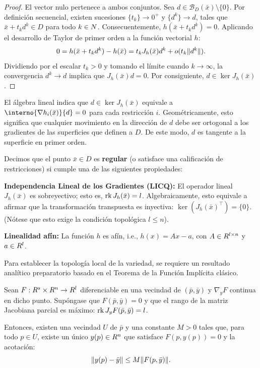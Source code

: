 \begin{proof}
	El vector nulo pertenece a ambos conjuntos. Sea $d \in \mathcal{B}_D(\bar{x}) \setminus \{0\}$. Por definición secuencial, existen sucesiones $\{t_k\} \to 0^+$ y $\{d^k\} \to d$, tales que $\bar{x} + t_k d^k \in D$ para todo $k \in N$. Consecuentemente, $h(\bar{x} + t_k d^k) = 0$. Aplicando el desarrollo de Taylor de primer orden a la función vectorial $h$:
	\[
 0 = h(\bar{x} + t_k d^k) - h(\bar{x}) = t_k J_h(\bar{x})d^k + o(t_k \lVert d^k\rVert).
	\]
	Dividiendo por el escalar $t_k > 0$ y tomando el límite cuando $k \to \infty$, la convergencia $d^k \to d$ implica que $J_h(\bar{x})d = 0$. Por consiguiente, $d \in \ker J_h(\bar{x})$.
\end{proof}

\begin{notabox}
 El álgebra lineal indica que $d \in \ker J_h(\bar{x})$ equivale a $\interno{\nabla h_i(\bar{x})}{d} = 0$ para cada restricción $i$. Geométricamente, esto significa que cualquier movimiento en la dirección de $d$ debe ser ortogonal a los gradientes de las superficies que definen a $D$. De este modo, $d$ es tangente a la superficie en primer orden.
\end{notabox}

\begin{definition}\label{v1:def:2.1.2}
	Decimos que el punto $\bar{x} \in D$ es \textbf{regular} (o satisface una calificación de restricciones) si cumple una de las siguientes propiedades:
	\begin{enuthm}
		\item \textbf{Independencia Lineal de los Gradientes (LICQ):} El operador lineal $J_h(\bar{x})$ es sobreyectivo; esto es, $\operatorname{rk} J_h(\bar{x}) = l$. Algebraicamente, esto equivale a afirmar que la transformación transpuesta es inyectiva: $\ker(J_h(\bar{x})^\top) = \{0\}$. (Nótese que esto exige la condición topológica $l \le n$).
		\item \textbf{Linealidad afín:} La función $h$ es afín, i.e., $h(x) = Ax - a$, con $A \in R^{l \times n}$ y $a \in R^l$.
	\end{enuthm}
\end{definition}

Para establecer la topología local de la variedad, se requiere un resultado analítico preparatorio basado en el Teorema de la Función Implícita clásico.

\begin{lemma}\label{v1:lem:2.1.1}
 Sean $F : R^s \times R^n \to R^l$ diferenciable en una vecindad de $(\bar{p}, \bar{y})$ y $\nabla_y F$ continua en dicho punto. Supóngase que $F(\bar{p}, \bar{y}) = 0$ y que el rango de la matriz Jacobiana parcial es máximo: $\operatorname{rk} J_y F(\bar{p}, \bar{y}) = l$.
 
 Entonces, existen una vecindad $U$ de $\bar{p}$ y una constante $M > 0$ tales que, para todo $p \in U$, existe un único $y(p) \in R^n$ que satisface $F(p, y(p)) = 0$ y la acotación:
 \[
 \lVert y(p) - \bar{y}\rVert \le M \lVert F(p, \bar{y})\rVert.
 \]
\end{lemma}

